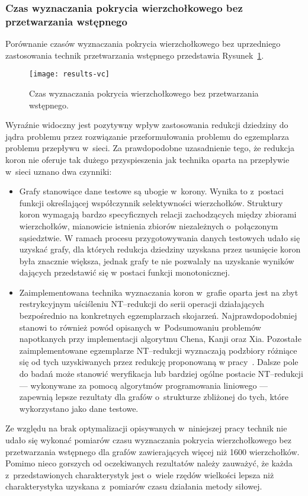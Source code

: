 \subsubsection{\textbf{Czas wyznaczania pokrycia wierzchołkowego bez przetwarzania wstępnego}}\label{time_vc}
\par{
  Porównanie czasów wyznaczania pokrycia wierzchołkowego bez uprzedniego zastosowania technik przetwarzania wstępnego przedstawia Rysunek~\ref{fig_results_vc}.
  \begin{figure}
    \caption{Czas wyznaczania pokrycia wierzchołkowego bez przetwarzania wstępnego.}
    \label{fig_results_vc}
    \centering
      \texttt{[image: results-vc]}
  \end{figure}
  Wyraźnie widoczny jest pozytywny wpływ zastosowania redukcji dziedziny do jądra problemu przez rozwiązanie przeformułowania problemu do egzemplarza problemu przepływu w~sieci.
  Za prawdopodobne uzasadnienie tego, że redukcja koron nie oferuje tak dużego przyspieszenia jak technika oparta na przepływie w~sieci uznano dwa czynniki:
  \begin{itemize}
    \item Grafy stanowiące dane testowe są ubogie w~korony.
    Wynika to z~postaci funkcji określającej współczynnik selektywności wierzchołków. Struktury koron wymagają bardzo specyficznych relacji zachodzących między zbiorami wierzchołków, mianowicie istnienia zbiorów niezależnych o~połączonym sąsiedztwie.
    W ramach procesu przygotowywania danych testowych udało się uzyskać grafy, dla których redukcja dziedziny uzyskana przez usunięcie koron była znacznie większa, jednak grafy te nie pozwalały na uzyskanie wyników dających przedstawić się w postaci funkcji monotonicznej.
    \item Zaimplementowana technika wyznaczania koron w~grafie oparta jest na zbyt restrykcyjnym uściśleniu NT--redukcji do serii operacji działających bezpośrednio na konkretnych egzemplarzach skojarzeń.
    Najprawdopodobniej stanowi to również powód opisanych w~Podsumowaniu problemów napotkanych przy implementacji algorytmu Chena, Kanji oraz Xia.
    Pozostałe zaimplementowane egzemplarze NT--redukcji wyznaczają podzbiory różniące się od tych uzyskiwanych przez redukcję proponowaną w pracy~\cite{KernelizationAlgorithms04}.
    Dalsze pole do badań może stanowić weryfikacja lub bardziej ogólne postacie NT--redukcji --- wykonywane za pomocą algorytmów programowania liniowego --- zapewnią lepsze rezultaty dla grafów o~strukturze zbliżonej do tych, które wykorzystano jako dane testowe.
  \end{itemize}

  Ze względu na brak optymalizacji opisywanych w~niniejszej pracy technik nie udało się wykonać pomiarów czasu wyznaczania pokrycia wierzchołkowego bez przetwarzania wstępnego dla grafów zawierających więcej niż 1600 wierzchołków.
  Pomimo nieco gorszych od oczekiwanych rezultatów należy zauważyć, że każda z~przedstawionych charakterystyk jest o~wiele rzędów wielkości lepsza niż charakterystyka uzyskana z~pomiarów czasu działania metody siłowej.
}
